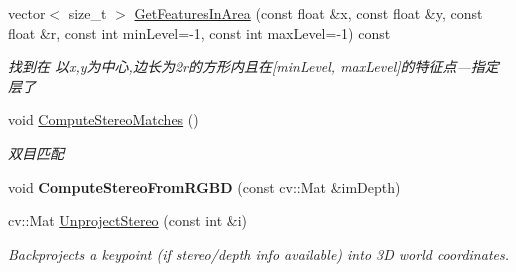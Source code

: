 \begin{DoxyCompactItemize}
\item 
vector$<$ size\-\_\-t $>$ \hyperlink{classORB__SLAM2_1_1Frame_ab92eb055abb54bf7f73db7612673dbca}{Get\-Features\-In\-Area} (const float \&x, const float \&y, const float \&r, const int min\-Level=-\/1, const int max\-Level=-\/1) const 
\begin{DoxyCompactList}\small\item\em 找到在 以x,y为中心,边长为2r的方形内且在\mbox{[}min\-Level, max\-Level\mbox{]}的特征点---指定层了 \end{DoxyCompactList}\item 
void \hyperlink{classORB__SLAM2_1_1Frame_a77a570d7851bad90ca31c4d55a5105e7}{Compute\-Stereo\-Matches} ()
\begin{DoxyCompactList}\small\item\em 双目匹配 \end{DoxyCompactList}\item 
\hypertarget{classORB__SLAM2_1_1Frame_a2818781adf6aec30b8bd8783ba228dce}{void {\bfseries Compute\-Stereo\-From\-R\-G\-B\-D} (const cv\-::\-Mat \&im\-Depth)}\label{classORB__SLAM2_1_1Frame_a2818781adf6aec30b8bd8783ba228dce}

\item 
cv\-::\-Mat \hyperlink{classORB__SLAM2_1_1Frame_a46084d187e1fc60181e1c72f77c733ca}{Unproject\-Stereo} (const int \&i)
\begin{DoxyCompactList}\small\item\em Backprojects a keypoint (if stereo/depth info available) into 3\-D world coordinates. \end{DoxyCompactList}\end{DoxyCompactItemize}
